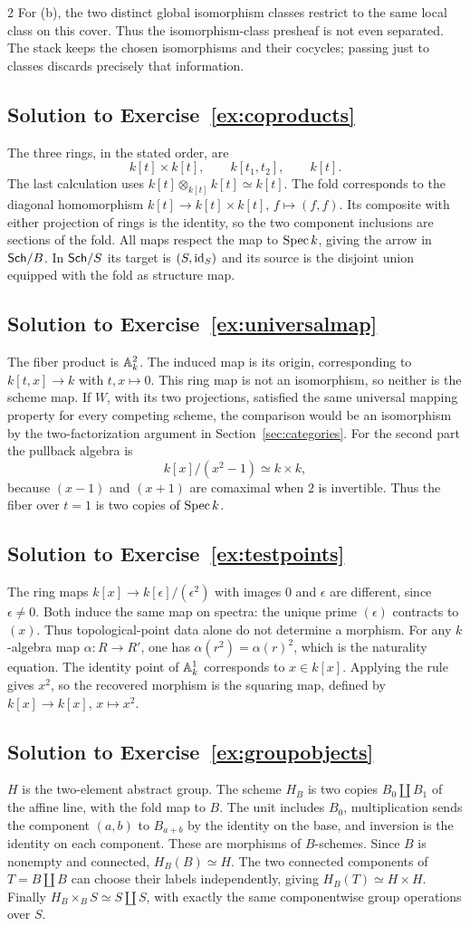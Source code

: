 \documentclass[12pt]{memoir}
\newcommand{\BGsolution}[1]{\subsection*{Solution to Exercise~\ref{#1}}\label{sol:#1}}
\begin{document}
\begin{multicols}{2}
For (b), the two distinct global isomorphism classes restrict to the
same local class on this cover. Thus the isomorphism-class presheaf is
not even separated. The stack keeps the chosen isomorphisms and their
cocycles; passing just to classes discards precisely that information.

\BGsolution{ex:coproducts}
The three rings, in the stated order, are
\[
k[t]\times k[t],\qquad k[t_1,t_2],\qquad k[t].
\]
The last calculation uses $k[t]\otimes_{k[t]}k[t]\simeq k[t]$.
The fold corresponds to the diagonal homomorphism
$k[t]\to k[t]\times k[t]$, $f\mapsto(f,f)$.
Its composite with either projection of rings is the identity, so
the two component inclusions are sections of the fold. All maps
respect the map to $\operatorname{Spec} k$, giving the arrow in $\mathsf{Sch}/B$.
In $\mathsf{Sch}/S$ its target is $(S,\operatorname{id}_S)$ and its source is the
disjoint union equipped with the fold as structure map.

\BGsolution{ex:universalmap}
The fiber product is $\mathbb{A}^2_k$. The induced map is its origin,
corresponding to $k[t,x]\to k$ with $t,x\mapsto0$. This ring map
is not an isomorphism, so neither is the scheme map. If $W$, with its
two projections, satisfied the same universal mapping property for
every competing scheme, the comparison would be an isomorphism by
the two-factorization argument in Section~\ref{sec:categories}.
For the second part the pullback algebra is
\[
k[x]/(x^2-1)\simeq k\times k,
\]
because $(x-1)$ and $(x+1)$ are comaximal when $2$ is invertible.
Thus the fiber over $t=1$ is two copies of $\operatorname{Spec} k$.

\BGsolution{ex:testpoints}
The ring maps $k[x]\to k[\epsilon]/(\epsilon^2)$ with images $0$
and $\epsilon$ are different, since $\epsilon\ne0$. Both induce
the same map on spectra: the unique prime $(\epsilon)$ contracts to
$(x)$. Thus topological-point data alone do not determine a morphism.
For any $k$-algebra map $\alpha:R\to R'$, one has
$\alpha(r^2)=\alpha(r)^2$, which is the naturality equation.
The identity point of $\mathbb{A}^1_k$ corresponds to $x\in k[x]$.
Applying the rule gives $x^2$, so the recovered morphism is the
squaring map, defined by $k[x]\to k[x]$, $x\mapsto x^2$.

\BGsolution{ex:groupobjects}
$H$ is the two-element abstract group. The scheme $H_B$ is two
copies $B_0\amalg B_1$ of the affine line, with the fold map to $B$.
The unit includes $B_0$, multiplication sends the component $(a,b)$
to $B_{a+b}$ by the identity on the base, and inversion is the
identity on each component. These are morphisms of $B$-schemes.
Since $B$ is nonempty and connected, $H_B(B)\simeq H$.
The two connected components of $T=B\amalg B$ can choose their
labels independently, giving $H_B(T)\simeq H\times H$.
Finally $H_B\times_B S\simeq S\amalg S$, with exactly the same
componentwise group operations over $S$.


\end{multicols}
\end{document}
